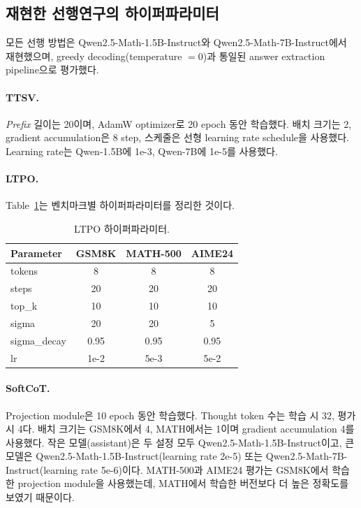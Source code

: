 \subsection{재현한 선행연구의 하이퍼파라미터}

모든 선행 방법은 Qwen2.5-Math-1.5B-Instruct와 Qwen2.5-Math-7B-Instruct에서 재현했으며, greedy decoding(temperature $= 0$)과 통일된 answer extraction pipeline으로 평가했다.

\paragraph{TTSV.} \emph{Prefix} 길이는 20이며, AdamW optimizer로 20 epoch 동안 학습했다. 배치 크기는 2, gradient accumulation은 8 step, 스케줄은 선형 learning rate schedule을 사용했다. Learning rate는 Qwen-1.5B에 1e-3, Qwen-7B에 1e-5를 사용했다.

\paragraph{LTPO.} Table~\ref{tab:hp_ltpo}는 벤치마크별 하이퍼파라미터를 정리한 것이다.

\begin{table}[ht]
\centering
\caption{LTPO 하이퍼파라미터.}
\label{tab:hp_ltpo}
\footnotesize
\renewcommand{\arraystretch}{0.9}
\begin{tabular}{lccc}
\toprule
\textbf{Parameter} & \textbf{GSM8K} & \textbf{MATH-500} & \textbf{AIME24} \\
\midrule
tokens & 8 & 8 & 8 \\
steps & 20 & 20 & 20 \\
top\_k & 10 & 10 & 10 \\
sigma & 20 & 20 & 5 \\
sigma\_decay & 0.95 & 0.95 & 0.95 \\
lr & 1e-2 & 5e-3 & 5e-2 \\
\bottomrule
\end{tabular}
\end{table}

\paragraph{SoftCoT.} Projection module은 10 epoch 동안 학습했다. Thought token 수는 학습 시 32, 평가 시 4다. 배치 크기는 GSM8K에서 4, MATH에서는 1이며 gradient accumulation 4를 사용했다. 작은 모델(assistant)은 두 설정 모두 Qwen2.5-Math-1.5B-Instruct이고, 큰 모델은 Qwen2.5-Math-1.5B-Instruct(learning rate 2e-5) 또는 Qwen2.5-Math-7B-Instruct(learning rate 5e-6)이다. MATH-500과 AIME24 평가는 GSM8K에서 학습한 projection module을 사용했는데, MATH에서 학습한 버전보다 더 높은 정확도를 보였기 때문이다.

